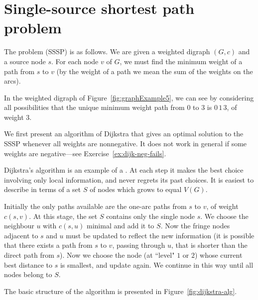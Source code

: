 \section{Single-source shortest path problem}
\label{sec:SSSP}

The  problem (SSSP) is as
follows. We are given a weighted digraph $(G, c)$ and a source node
$s$. For each node $v$ of $G$, we must find the minimum weight of a path
from $s$ to $v$ (by the weight of a path we mean the sum of the weights
on the arcs).

\begin{Example}
\label{eg:SSSP}
In the weighted digraph of Figure~\ref{fig:graphExample5}, we can see by
considering all possibilities that the unique minimum weight path from
$0$ to $3$ is $0\, 1\, 3$, of weight $3$.
\end{Example}

We first present an algorithm of Dijkstra that gives an optimal
solution to the SSSP whenever all weights are nonnegative. It
does not work in general if some weights are negative---see
Exercise~\ref{ex:dijk-neg-fails}. 

Dijkstra's algorithm is an example of a . At
each step it makes the best choice involving only local information,
and never regrets its past choices. It is easiest to describe in terms of
a set $S$ of nodes which grows to equal $V(G)$. 

Initially the only paths available are the one-arc paths from $s$ to
$v$, of weight $c(s, v)$. At this stage, the set $S$  contains only the
single node $s$. We choose the neighbour $u$ with $c(s, u)$ minimal and
add it to $S$. Now the fringe nodes adjacent to $s$ and $u$ must be
updated to reflect the new information (it is possible that there
exists a path from $s$ to $v$, passing through $u$, that is shorter
than the direct path from $s$). Now we choose the node (at ``level" $1$
or $2$) whose current best distance to $s$ is smallest, and update
again. We continue in this way until all nodes belong to $S$.

The basic structure of the algorithm is presented in
Figure~\ref{fig:dijkstra-alg}.


